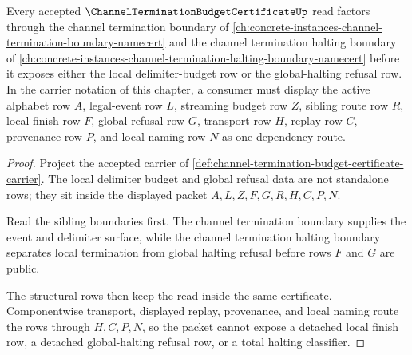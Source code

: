 \begin{theorem}
\label{thm:channel-termination-budget-certificate-orphan-route}
Every accepted $\ChannelTerminationBudgetCertificateUp$ read factors through the channel termination boundary of \autoref{ch:concrete-instances-channel-termination-boundary-namecert} and the channel termination halting boundary of \autoref{ch:concrete-instances-channel-termination-halting-boundary-namecert} before it exposes either the local delimiter-budget row or the global-halting refusal row. In the carrier notation of this chapter, a consumer must display the active alphabet row $A$, legal-event row $L$, streaming budget row $Z$, sibling route row $R$, local finish row $F$, global refusal row $G$, transport row $H$, replay row $C$, provenance row $P$, and local naming row $N$ as one dependency route.
\end{theorem}
\begin{proof}
Project the accepted carrier of \autoref{def:channel-termination-budget-certificate-carrier}. The local delimiter budget and global refusal data are not standalone rows; they sit inside the displayed packet $A,L,Z,F,G,R,H,C,P,N$.

Read the sibling boundaries first. The channel termination boundary supplies the event and delimiter surface, while the channel termination halting boundary separates local termination from global halting refusal before rows $F$ and $G$ are public.

The structural rows then keep the read inside the same certificate. Componentwise transport, displayed replay, provenance, and local naming route the rows through $H,C,P,N$, so the packet cannot expose a detached local finish row, a detached global-halting refusal row, or a total halting classifier.
\end{proof}
